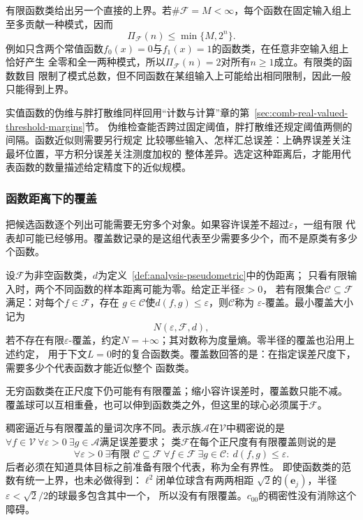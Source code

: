 有限函数类给出另一个直接的上界。若$\#\mathcal{F}=M<\infty$，每个函数在固定输入组上
至多贡献一种模式，因而
\[
  \Pi_{\mathcal{F}}(n)\leq\min\{M,2^n\}.
\]
例如只含两个常值函数$f_0(x)=0$与$f_1(x)=1$的函数类，在任意非空输入组上恰好产生
全零和全一两种模式，所以$\Pi_{\mathcal{F}}(n)=2$对所有$n\geq1$成立。有限类的函数数目
限制了模式总数，但不同函数在某组输入上可能给出相同限制，因此一般只能得到上界。

实值函数的伪维与胖打散维同样回用“计数与计算”章的第~\ref{sec:comb-real-valued-threshold-margins}节。
伪维检查能否跨过固定阈值，胖打散维还规定阈值两侧的间隔。函数近似则需要另行规定
比较哪些输入、怎样汇总误差：上确界误差关注最坏位置，平方积分误差关注测度加权的
整体差异。选定这种距离后，才能用代表函数的数量描述给定精度下的近似规模。

\subsubsection{函数距离下的覆盖}

把候选函数逐个列出可能需要无穷多个对象。如果容许误差不超过$\varepsilon$，一组有限
代表却可能已经够用。覆盖数记录的是这组代表至少需要多少个，而不是原类有多少个函数。
\begin{definition}[函数类的覆盖数与度量熵]
\label{def:functional-covering-number}
设$\mathcal F$为非空函数类，$d$为定义~\ref{def:analysis-pseudometric}中的伪距离；
只看有限输入时，两个不同函数的样本距离可能为零。给定正半径$\varepsilon>0$，
若有限集合$\mathcal{C}\subseteq\mathcal{F}$满足：对每个$f\in\mathcal{F}$，存在
$g\in\mathcal{C}$使$d(f,g)\leq\varepsilon$，则$\mathcal{C}$称为
$\varepsilon$-覆盖。最小覆盖大小记为
\[
  N(\varepsilon,\mathcal{F},d),
\]
若不存在有限$\varepsilon$-覆盖，约定$N=+\infty$；其对数称为度量熵。零半径的覆盖也沿用上述约定，
用于下文$L=0$时的复合函数类。覆盖数回答的是：在指定误差尺度下，需要多少个代表函数才能近似整个
函数类。
\end{definition}
无穷函数类在正尺度下仍可能有有限覆盖；缩小容许误差时，覆盖数只能不减。
覆盖球可以互相重叠，也可以伸到函数类之外，但这里的球心必须属于$\mathcal F$。

稠密逼近与有限覆盖的量词次序不同。表示族$\mathcal A$在$\mathcal V$中稠密说的是
$\forall f\in\mathcal V\ \forall\varepsilon>0\ \exists g\in\mathcal A$满足误差要求；
类$\mathcal F$在每个正尺度有有限覆盖则说的是
\[
 \forall\varepsilon>0\ \exists\text{有限 }\mathcal C\subseteq\mathcal F\
 \forall f\in\mathcal F\ \exists g\in\mathcal C:\ d(f,g)\leq\varepsilon.
\]
后者必须在知道具体目标之前准备有限个代表，称为全有界性。
即使函数类的范数有统一上界，也未必做得到：$\ell^2$闭单位球含有两两相距
$\sqrt2$的$(\bm e_j)$，半径$\varepsilon<\sqrt2/2$的球最多包含其中一个，
所以没有有限覆盖。$c_{00}$的稠密性没有消除这个障碍。

